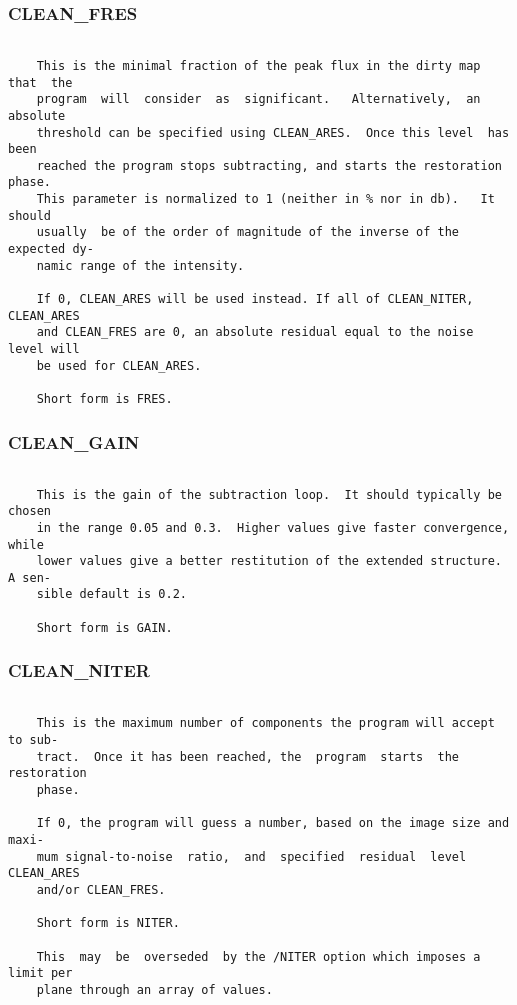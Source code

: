 \subsubsection{CLEAN\_FRES}
\begin{verbatim}

    This is the minimal fraction of the peak flux in the dirty map that  the
    program  will  consider  as  significant.   Alternatively,  an  absolute
    threshold can be specified using CLEAN_ARES.  Once this level  has  been
    reached the program stops subtracting, and starts the restoration phase.
    This parameter is normalized to 1 (neither in % nor in db).   It  should
    usually  be of the order of magnitude of the inverse of the expected dy-
    namic range of the intensity.

    If 0, CLEAN_ARES will be used instead. If all of CLEAN_NITER, CLEAN_ARES
    and CLEAN_FRES are 0, an absolute residual equal to the noise level will
    be used for CLEAN_ARES.

    Short form is FRES.

\end{verbatim}
\subsubsection{CLEAN\_GAIN}
\begin{verbatim}

    This is the gain of the subtraction loop.  It should typically be chosen
    in the range 0.05 and 0.3.  Higher values give faster convergence, while
    lower values give a better restitution of the extended structure. A sen-
    sible default is 0.2.

    Short form is GAIN.

\end{verbatim}
\subsubsection{CLEAN\_NITER}
\begin{verbatim}

    This is the maximum number of components the program will accept to sub-
    tract.  Once it has been reached, the  program  starts  the  restoration
    phase.

    If 0, the program will guess a number, based on the image size and maxi-
    mum signal-to-noise  ratio,  and  specified  residual  level  CLEAN_ARES
    and/or CLEAN_FRES.

    Short form is NITER.

    This  may  be  overseded  by the /NITER option which imposes a limit per
    plane through an array of values.

\end{verbatim}
